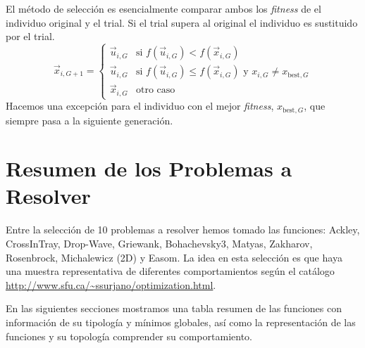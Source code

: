 \documentclass{article}
\begin{document}
El método de selección es esencialmente comparar ambos los \textit{fitness} de el individuo original y el trial. Si el trial supera al original el individuo es sustituido por el trial.
\begin{equation}
    \vec{x}_{i,G+1} = \left\{\begin{array}{cl}
            \vec{u}_{i,G}&\text{si }f(\vec{u}_{i,G})<f(\vec{x}_{i,G})\\
            \vec{u}_{i,G}&\text{si }f(\vec{u}_{i,G})\le f(\vec{x}_{i,G})\text{ y }x_{i, G}\neq x_{\text{best}, G}\\
            \vec{x}_{i,G}&\text{otro caso}
        \end{array}\right.
\label{ec_seleccion}
\end{equation}
Hacemos una excepción para el individuo con el mejor \textit{fitness}, $x_{\text{best},G}$, que siempre pasa a la siguiente generación.

\section{Resumen de los Problemas a Resolver\label{sec_funciones}}
Entre la selección de 10 problemas a resolver hemos tomado las funciones: Ackley, CrossInTray, Drop-Wave, Griewank, Bohachevsky3, Matyas, Zakharov, Rosenbrock, Michalewicz (2D) y Easom. La idea en esta selección es que haya una muestra representativa de diferentes comportamientos según el catálogo \url{http://www.sfu.ca/~ssurjano/optimization.html}.

En las siguientes secciones mostramos una tabla resumen de las funciones con información de su tipología y mínimos globales, así como la representación de las funciones y su topología comprender su comportamiento.
\end{document}
